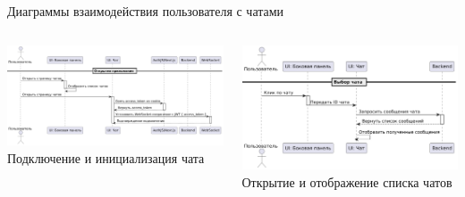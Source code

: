 \documentclass[aspectratio=169]{beamer}
\begin{document}
\begin{frame}{Диаграммы взаимодействия пользователя с чатами}
\vspace{0.5em}

\begin{columns}
    \begin{column}{0.5\textwidth}
        \centering
        \includegraphics[width=0.95\linewidth]{static/ChatConnectDiagram.png} \\
        \small Подключение и инициализация чата
    \end{column}
    \begin{column}{0.5\textwidth}
        \centering
        \includegraphics[width=0.95\linewidth]{static/ChatInteractionDiagram.png} \\
        \small Открытие и отображение списка чатов
    \end{column}
\end{columns}
\end{frame}
\end{document}
